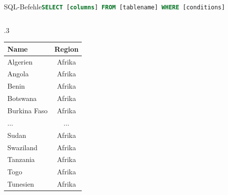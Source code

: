 \begin{frame}[fragile]{SQL-Befehle}{\lstinline[language=SQL]|SELECT [columns] FROM [tablename] WHERE [conditions]|}
\begin{columns}[c]
\begin{column}{.3\textwidth}
\begin{table}
\begin{tabular}{lc}
          \textbf{Name} & \textbf{Region} \\
          \midrule
          Algerien      & Afrika          \\
          Angola        & Afrika          \\
          Benin         & Afrika          \\
          Botswana      & Afrika          \\
          Burkina Faso  & Afrika          \\
          \midrule
          ...           & ...             \\
          \midrule
          Sudan         & Afrika          \\
          Swaziland     & Afrika          \\
          Tanzania      & Afrika          \\
          Togo          & Afrika          \\
          Tunesien      & Afrika          \\
          \bottomrule
        \end{tabular}
      \end{table}
    \end{column}
  \end{columns}
\end{frame}

